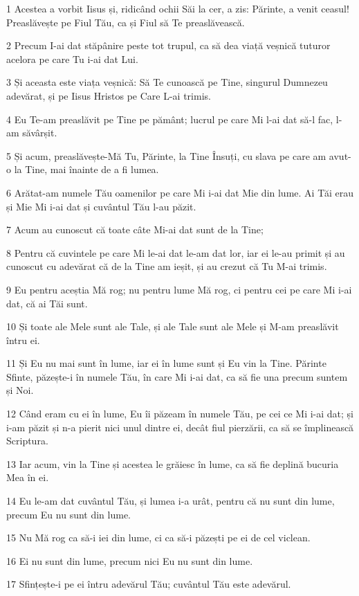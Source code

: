 \par 1 Acestea a vorbit Iisus și, ridicând ochii Săi la cer, a zis: Părinte, a venit ceasul! Preaslăvește pe Fiul Tău, ca și Fiul să Te preaslăvească.
\par 2 Precum I-ai dat stăpânire peste tot trupul, ca să dea viață veșnică tuturor acelora pe care Tu i-ai dat Lui.
\par 3 Și aceasta este viața veșnică: Să Te cunoască pe Tine, singurul Dumnezeu adevărat, și pe Iisus Hristos pe Care L-ai trimis.
\par 4 Eu Te-am preaslăvit pe Tine pe pământ; lucrul pe care Mi l-ai dat să-l fac, l-am săvârșit.
\par 5 Și acum, preaslăvește-Mă Tu, Părinte, la Tine Însuți, cu slava pe care am avut-o la Tine, mai înainte de a fi lumea.
\par 6 Arătat-am numele Tău oamenilor pe care Mi i-ai dat Mie din lume. Ai Tăi erau și Mie Mi i-ai dat și cuvântul Tău l-au păzit.
\par 7 Acum au cunoscut că toate câte Mi-ai dat sunt de la Tine;
\par 8 Pentru că cuvintele pe care Mi le-ai dat le-am dat lor, iar ei le-au primit și au cunoscut cu adevărat că de la Tine am ieșit, și au crezut că Tu M-ai trimis.
\par 9 Eu pentru aceștia Mă rog; nu pentru lume Mă rog, ci pentru cei pe care Mi i-ai dat, că ai Tăi sunt.
\par 10 Și toate ale Mele sunt ale Tale, și ale Tale sunt ale Mele și M-am preaslăvit întru ei.
\par 11 Și Eu nu mai sunt în lume, iar ei în lume sunt și Eu vin la Tine. Părinte Sfinte, păzește-i în numele Tău, în care Mi i-ai dat, ca să fie una precum suntem și Noi.
\par 12 Când eram cu ei în lume, Eu îi păzeam în numele Tău, pe cei ce Mi i-ai dat; și i-am păzit și n-a pierit nici unul dintre ei, decât fiul pierzării, ca să se împlinească Scriptura.
\par 13 Iar acum, vin la Tine și acestea le grăiesc în lume, ca să fie deplină bucuria Mea în ei.
\par 14 Eu le-am dat cuvântul Tău, și lumea i-a urât, pentru că nu sunt din lume, precum Eu nu sunt din lume.
\par 15 Nu Mă rog ca să-i iei din lume, ci ca să-i păzești pe ei de cel viclean.
\par 16 Ei nu sunt din lume, precum nici Eu nu sunt din lume.
\par 17 Sfințește-i pe ei întru adevărul Tău; cuvântul Tău este adevărul.
